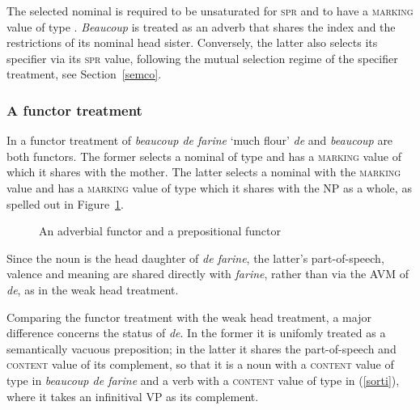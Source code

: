 \documentclass[output=paper
	        ,collection
	        ,collectionchapter
 	        ,biblatex
                ,babelshorthands
                ,newtxmath
                ,draftmode
                ,colorlinks, citecolor=brown
]{langscibook}
\begin{document}
\noindent
The selected nominal is required to be unsaturated for \textsc{spr} and to have a 
\textsc{marking} value of type . \emph{Beaucoup} is treated as an adverb that  
shares the index and the restrictions of its nominal head sister. Conversely, the latter
also selects its specifier via its \textsc{spr} value, following the mutual 
selection regime of the specifier treatment, see Section~\ref{semco}.


\subsubsection{A functor treatment} 


In a functor treatment of \emph{beaucoup de farine} `much flour' \emph{de} and 
\emph{beaucoup} are both functors. The former selects a nominal of type  and 
has a \textsc{marking} value of  which it shares with the mother. 
The latter selects a nominal with the \textsc{marking} value 
 and has a \textsc{marking} value of type  which it 
shares with the NP as a whole, as spelled out in Figure~\ref{beau}.

\begin{figure}
\centering
{}
\caption{\label{beau} An adverbial functor and a prepositional functor}
\end{figure}

Since the noun is the head daughter of \emph{de farine}, the latter's 
part-of-speech, valence and meaning are shared directly with \emph{farine}, 
rather than via the AVM of \emph{de}, as in the weak head treatment. 

Comparing the functor treatment with the weak head treatment,  
a major difference concerns the status of \emph{de}. In the former it is 
unifomly treated as a semantically vacuous preposition; in the latter it shares 
the part-of-speech and \textsc{content} value of its complement, so that it is 
a noun with a \textsc{content} value of type  in 
\emph{beaucoup de farine} and a verb with a \textsc{content} value of type 
 in (\ref{sorti}), where it takes 
an infinitival VP as its complement.   
\end{document}

